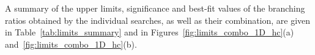 A summary of the upper limits, significance and best-fit values of the branching ratios obtained by the individual searches, as well as their combination, are given  
in Table~\ref{tab:limits_summary} and in Figures~\ref{fig:limits_combo_1D_hc}(a) and~\ref{fig:limits_combo_1D_hc}(b).

